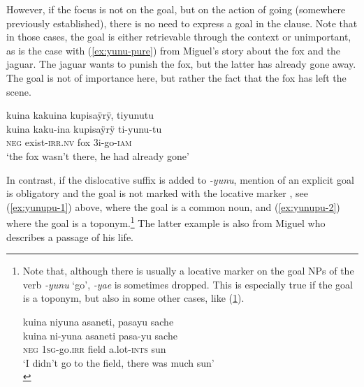 However, if the focus is not on the goal, but on the action of going (somewhere previously established), there is no need to express a goal in the clause. Note that in those cases, the goal is either retrievable through the context or unimportant, as is the case with (\ref{ex:yunu-pure}) from Miguel’s story about the fox and the jaguar. The jaguar wants to punish the fox, but the latter has already gone away. The goal is not of importance here, but rather the fact that the fox has left the scene.

\ea\label{ex:yunu-pure}
\begingl
\glpreamble kuina kakuina kupisaÿrÿ, tiyunutu\\
\gla kuina kaku-ina kupisaÿrÿ ti-yunu-tu\\
\glb \textsc{neg} exist-\textsc{irr.nv} fox 3i-go-\textsc{iam}\\
\glft ‘the fox wasn’t there, he had already gone’
\endgl
\trailingcitation{[jmx-n120429ls-x5.167-168]}
\xe

In contrast, if the dislocative suffix is added to \textit{-yunu}, mention of an explicit goal is obligatory and the goal is not marked with the locative marker , see (\ref{ex:yunupu-1}) above, where the goal is a common noun, and (\ref{ex:yunupu-2}) where the goal is a toponym.\footnote{Note that, although there is usually a locative marker on the goal NPs of the verb \textit{-yunu} ‘go’, \textit{-yae} is sometimes dropped. This is especially true if the goal is a toponym, but also in some other cases, like %
 (\ref{ex:yunu-GOAL-3}).


\ea\label{ex:yunu-GOAL-3}
\begingl 
\glpreamble kuina niyuna asaneti, pasayu sache\\
\gla kuina ni-yuna asaneti pasa-yu sache\\ 
\glb \textsc{neg} 1\textsc{sg}-go.\textsc{irr} field a.lot-\textsc{ints} sun\\ 
\glft ‘I didn’t go to the field, there was much sun’\\ 
\endgl
\trailingcitation{[rmx-e150922l.004]}%
\xe
} The latter example is also from Miguel who describes a passage of his life.

